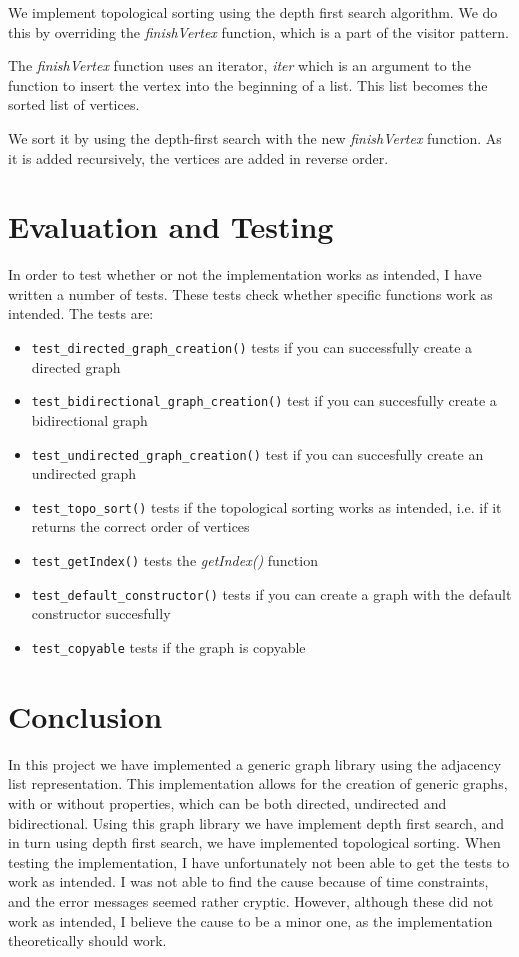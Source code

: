 \documentclass{article}
\begin{document}
We implement topological sorting using the depth first search algorithm.
We do this by overriding the \textit{finishVertex} function, which is 
a part of the visitor pattern. 

The \textit{finishVertex} function uses an iterator, \textit{iter} which 
is an argument to the function to insert the vertex into the beginning of
a list. This list becomes the sorted list of vertices. 

We sort it by using the depth-first search with the new \textit{finishVertex}
function. As it is added recursively, the vertices are added in reverse order.

\section{Evaluation and Testing}

In order to test whether or not the implementation works as intended, 
I have written a number of tests. 
These tests check whether specific functions work as intended. The 
tests are: 
\begin{itemize}
    \item \texttt{test\_directed\_graph\_creation()} tests if you can successfully create a directed graph 
    \item \texttt{test\_bidirectional\_graph\_creation()} test if you can succesfully create a bidirectional graph
    \item \texttt{test\_undirected\_graph\_creation()} test if you can succesfully create an undirected graph
    \item \texttt{test\_topo\_sort()} tests if the topological sorting works as intended, i.e. if it returns the correct order of vertices
    \item \texttt{test\_getIndex()} tests the \textit{getIndex()} function
    \item \texttt{test\_default\_constructor()} tests if you can create a graph with the default constructor succesfully
    \item \texttt{test\_copyable} tests if the graph is copyable
\end{itemize}



\section{Conclusion}

In this project we have implemented a generic graph library using the adjacency list representation.
This implementation allows for the creation of generic graphs, with or without properties, which can be both 
directed, undirected and bidirectional.
Using this graph library we have implement depth first search, and in turn using depth first search, we have implemented topological sorting.
When testing the implementation, I have unfortunately not been able to get the tests to work as intended. I was not able to find the cause because of time constraints, and the error messages seemed rather cryptic. 
However, although these did not work as intended, I believe the cause to be a minor one, as the implementation theoretically should work. 
\end{document}

